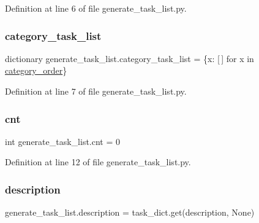 Definition at line 6 of file generate\+\_\+task\+\_\+list.\+py.

\mbox{\label{namespacegenerate__task__list_a7cc034df06c75ab55d875c56f83a725b}} 
\subsubsection{\texorpdfstring{category\+\_\+task\+\_\+list}{category\_task\_list}}
{\footnotesize\ttfamily dictionary generate\+\_\+task\+\_\+list.\+category\+\_\+task\+\_\+list = \{x\+: \mbox{[}$\,$\mbox{]} for x in \hyperlink{namespacegenerate__task__list_a7697d682f472185323fda0300e278233}{category\+\_\+order}\}}



Definition at line 7 of file generate\+\_\+task\+\_\+list.\+py.

\mbox{\label{namespacegenerate__task__list_ae18a2eff051bd4be84f3f37eb80342fb}} 
\subsubsection{\texorpdfstring{cnt}{cnt}}
{\footnotesize\ttfamily int generate\+\_\+task\+\_\+list.\+cnt = 0}



Definition at line 12 of file generate\+\_\+task\+\_\+list.\+py.

\mbox{\label{namespacegenerate__task__list_af4d07327ee07ddc711991e687bfe3a0a}} 
\subsubsection{\texorpdfstring{description}{description}}
{\footnotesize\ttfamily generate\+\_\+task\+\_\+list.\+description = task\+\_\+dict.\+get(\textquotesingle{}description\textquotesingle{}, None)}




